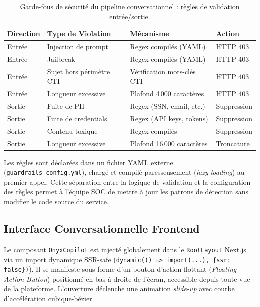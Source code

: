 \begin{table}[H]
\centering
\caption{Garde-fous de sécurité du pipeline conversationnel : règles de validation entrée/sortie.}
\label{tab:guardrails}
\begin{tabular}{|l|l|l|l|}
\hline
\textbf{Direction} & \textbf{Type de Violation} & \textbf{Mécanisme} & \textbf{Action} \\
\hline
Entrée & Injection de prompt & Regex compilés (YAML) & HTTP 403 \\
\hline
Entrée & Jailbreak & Regex compilés (YAML) & HTTP 403 \\
\hline
Entrée & Sujet hors périmètre CTI & Vérification mots-clés CTI & HTTP 403 \\
\hline
Entrée & Longueur excessive & Plafond 4\,000 caractères & HTTP 403 \\
\hline
Sortie & Fuite de PII & Regex (SSN, email, etc.) & Suppression \\
\hline
Sortie & Fuite de credentials & Regex (API keys, tokens) & Suppression \\
\hline
Sortie & Contenu toxique & Regex compilés & Suppression \\
\hline
Sortie & Longueur excessive & Plafond 16\,000 caractères & Troncature \\
\hline
\end{tabular}
\end{table}

Les règles sont déclarées dans un fichier YAML externe (\texttt{guardrails\_config.yml}), chargé et compilé paresseusement (\textit{lazy loading}) au premier appel. Cette séparation entre la logique de validation et la configuration des règles permet à l'équipe SOC de mettre à jour les patrons de détection sans modifier le code source du service.

\subsection{Interface Conversationnelle Frontend}

Le composant \texttt{OnyxCopilot} est injecté globalement dans le \texttt{RootLayout} Next.js via un import dynamique SSR-safe (\texttt{dynamic(() => import(...), \{ssr: false\})}). Il se manifeste sous forme d'un bouton d'action flottant (\textit{Floating Action Button}) positionné en bas à droite de l'écran, accessible depuis toute vue de la plateforme. L'ouverture déclenche une animation \textit{slide-up} avec courbe d'accélération cubique-bézier.


